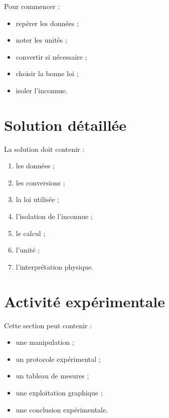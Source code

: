 \documentclass[11pt,a4paper]{article}
\begin{document}
\begin{cadreaide}
Pour commencer :
\begin{itemize}
    \item repérer les données ;
    \item noter les unités ;
    \item convertir si nécessaire ;
    \item choisir la bonne loi ;
    \item isoler l’inconnue.
\end{itemize}
\end{cadreaide}

\section{Solution détaillée}

\begin{cadresolution}
La solution doit contenir :
\begin{enumerate}
    \item les données ;
    \item les conversions ;
    \item la loi utilisée ;
    \item l’isolation de l’inconnue ;
    \item le calcul ;
    \item l’unité ;
    \item l’interprétation physique.
\end{enumerate}
\end{cadresolution}

\section{Activité expérimentale}

\begin{cadreactivite}
Cette section peut contenir :
\begin{itemize}
    \item une manipulation ;
    \item un protocole expérimental ;
    \item un tableau de mesures ;
    \item une exploitation graphique ;
    \item une conclusion expérimentale.
\end{itemize}
\end{cadreactivite}
\end{document}
